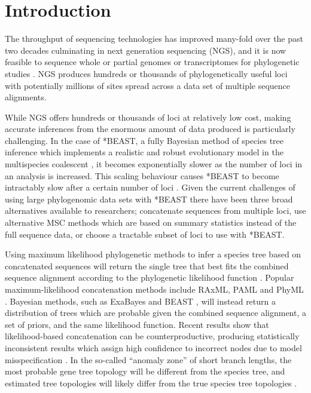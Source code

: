 \documentclass[12pt]{article}
\begin{document}
\section{Introduction}

The throughput of sequencing technologies has improved many-fold over the past
two decades culminating in next generation sequencing (NGS), and it is now
feasible to sequence whole or partial genomes or transcriptomes for phylogenetic
studies \citep{annurev-ecolsys-110512-135822}. NGS produces hundreds or
thousands of phylogenetically useful loci \citep[see for example][]{Blom20160181}
with potentially millions of sites spread across a data set of multiple
sequence alignments.

While NGS offers hundreds or thousands of loci at relatively low cost, making
accurate inferences from the enormous amount of data produced is particularly
challenging. In the case of *BEAST, a fully Bayesian method of species tree
inference which implements a realistic and robust evolutionary model in the
multispecies coalescent \citep[MSC;][]{Degnan2009332, Heled01032010}, it becomes exponentially
slower as the number of loci in an analysis is increased. This scaling behaviour
causes *BEAST to become intractably slow after a certain number of loci
\citep[the exact number will depend on other parameters of the data set, see][]{Ogilvie01052016}.
Given the current challenges of using large phylogenomic data sets with *BEAST
there have been three broad alternatives available to researchers; concatenate
sequences from multiple loci, use alternative MSC methods which are based on
summary statistics instead of the full sequence data, or choose a tractable
subset of loci to use with *BEAST.

Using maximum likelihood phylogenetic methods to infer a species tree based on concatenated
sequences will return the single tree that
best fits the combined sequence alignment according to the phylogenetic likelihood function \citep{Felsenstein1981}. Popular maximum-likelihood concatenation methods include
RAxML, PAML and PhyML \citep{Stamatakis01052014,
Yang01082007,Guindon01052010}. Bayesian methods, such as ExaBayes and BEAST
\citep{Aberer01102014, Drummond2007}, will instead return a distribution of trees which are probable
given the combined sequence alignment, a set of priors, and the same likelihood function.
Recent results show that likelihood-based concatenation
can be counterproductive, producing statistically inconsistent results which assign
high confidence to incorrect nodes due to model misspecification
\citep{NYAS:NYAS12747}. In the so-called ``anomaly zone'' of short branch
lengths, the most probable gene tree topology will be different from the species
tree, and estimated tree topologies will likely differ from the true species
tree topologies \citep{journal.pgen.0020068, Kubatko01022007}.
\end{document}
